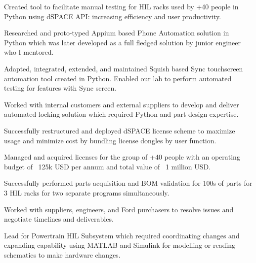\documentclass[]{deedy-resume-openfont}
\begin{document}
\begin{minipage}[t]{0.66\textwidth}
\begin{tightemize}
\item Created tool to facilitate manual testing for HIL racks used by +40 people in Python using dSPACE API: increasing efficiency and user productivity.
\item Researched and proto-typed Appium based Phone Automation solution in Python which was later developed as a full fledged solution by junior engineer who I mentored.
\item Adapted, integrated, extended, and maintained Squish based Sync touchscreen automation tool created in Python. Enabled our lab to perform automated testing for features with Sync screen.
\item Worked with internal customers and external suppliers to develop and deliver automated locking solution which required Python and part design expertise.
\end{tightemize}
\sectionsep

\begin{tightemize}
\item Successfully restructured and deployed dSPACE license scheme to maximize usage and minimize cost by bundling license dongles by user function.
\item Managed and acquired licenses for the group of +40 people with an operating budget of ~125k USD per annum and total value of ~1 million USD.
\item Successfully performed parts acquisition and BOM validation for 100s of parts for 3 HIL racks for two separate programs simultaneously. 
\item Worked with suppliers, engineers, and Ford purchasers to resolve issues and negotiate timelines and deliverables.
\item Lead for Powertrain HIL Subsystem which required coordinating changes and expanding capability using MATLAB and Simulink for modelling or reading schematics to make hardware changes.
\end{tightemize}
\sectionsep




\end{minipage}
\end{document}
